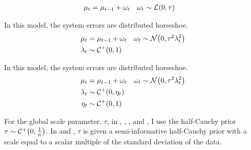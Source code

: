 \begin{description}[font = \normalfont\ModelII]
  \begin{equation}
    \label{dlm:eq:22}
    \begin{aligned}[t]
      \mu_{t} &= \mu_{t - 1} + \omega_{t} & \omega_{t} & \sim \mathcal{L}\mathopen{}\left(0, \tau\right)\mathclose{}
    \end{aligned}
  \end{equation}
\item[Horseshoe] In this model, the system errors are distributed horseshoe.
  \begin{equation}
    \label{dlm:eq:19}
    \begin{aligned}[t]
      \mu_{t} &= \mu_{t - 1} + \omega_{t} & \omega_{t} & \sim \mathcal{N}\mathopen{}\left(0, \tau^{2} \lambda^{2}_{t}\right)\mathclose{} \\
      \lambda_{t} &\sim \mathcal{C^+}\mathopen{}\left(0, 1\right)\mathclose{}
    \end{aligned}
  \end{equation}
\item[Horseshoe+] In this model, the system errors are distributed horseshoe.
  \begin{equation}
    \label{dlm:eq:23}
    \begin{aligned}[t]
      \mu_{t} &= \mu_{t - 1} + \omega_{t} & \omega_{t} & \sim \mathcal{N}\mathopen{}\left(0, \tau^{2} \lambda^{2}_{t}\right)\mathclose{} \\
      \lambda_{t} &\sim \mathcal{C^+}\mathopen{}\left(0, \eta_{t}\right)\mathclose{} \\
      \eta_{t} &\sim \mathcal{C^+}\mathopen{}\left(0, 1\right)\mathclose{}
    \end{aligned}
  \end{equation}
\end{description}
For the global scale parameter, $\tau$, in , , , and , I use the half-Cauchy prior $\tau \sim \mathcal{C^+}\mathopen{}\left(0, \frac{1}{n}\right)\mathclose{}$.
In  and , $\tau$ is given a semi-informative half-Cauchy prior with a scale equal to a scalar multiple of the standard deviation of the data.

